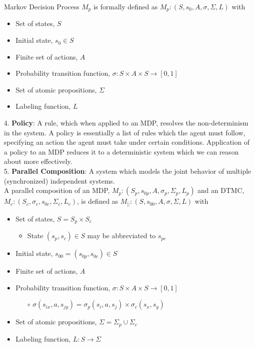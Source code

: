 \documentclass{article}
\begin{document}
Markov Decision Process $M_p$ is formally defined as $M_p: (S, s_0, A, \sigma, \Sigma, L)$ with
\begin{itemize}
    \setlength\itemsep{0em}
    \item Set of states, $S$
    \item Initial state, $s_0 \in S$
    \item Finite set of actions, $A$
    \item Probability transition function, $\sigma: S \times A \times S \rightarrow [0, 1]$
    \item Set of atomic propositions, $\Sigma$
    \item Labeling function, $L$
\end{itemize}
4. \textbf{Policy}: A rule, which when applied to an MDP, resolves the non-determinism in the system. A policy is essentially a list of rules which the agent must follow, specifying an action the agent must take under certain conditions. Application of a policy to an MDP reduces it to a deterministic system which we can reason about more effectively. \\

5. \textbf{Parallel Composition}: A system which models the joint behavior of multiple (synchronized) independent systems. \\

A parallel composition of an MDP, $M_p: (S_p, s_{0p}, A, \sigma_p, \Sigma_p, L_p)$ and an DTMC, $M_c: (S_c, \sigma_c, s_{0c}, \Sigma_c, L_c)$, is defined as 
$M_{||}: (S, s_{00}, A, \sigma, \Sigma, L)$ with
\begin{itemize}
    \setlength\itemsep{0em}
    \item Set of states, $S=S_p \times S_c$
        \begin{itemize}
            \item State $(s_{p},s_{c})\in S$ may be abbreviated to $s_{pc}$
        \end{itemize}
    \item Initial state, $s_{00} = (s_{0p},s_{0c}) \in S$
    \item Finite set of actions, $A$
    \item Probability transition function, $\sigma: S \times A \times S \rightarrow [0, 1]$
        \begin{itemize}
            \item[$\circ$] $\sigma(s_{ix}, a, s_{jy})=\sigma_p(s_i, a, s_j) \times \sigma_c(s_x, s_y)$
        \end{itemize}
    \item Set of atomic propositions, $\Sigma = \Sigma_p\cup\Sigma_c$
    \item Labeling function, $L : S\rightarrow \Sigma$
\end{itemize}
\end{document}
